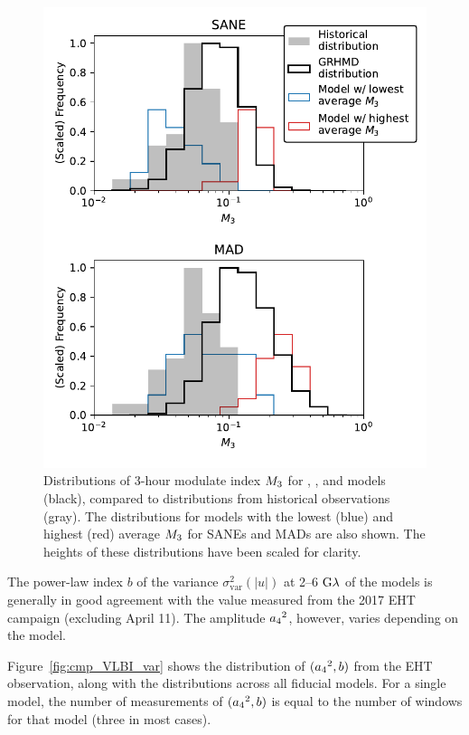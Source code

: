 \begin{figure}
  \centering
  \includegraphics[width=\columnwidth]{./figures/mi_hist.pdf}
  \caption{Distributions of 3-hour modulate index $M_{3}$ for \bhac, \kharma, and \hamr models (black), compared to distributions from historical observations (gray). The distributions for models with the lowest (blue) and highest (red) average $M_{3}$ for SANEs and MADs are also shown. The heights of these distributions have been scaled for clarity.
  }
  \label{fig:cmp_ALMA_var}
\end{figure}


The power-law index $b$ of the variance $\sigma_\text{var}^2 (|u|)$ at 2--6$~{\rm G}\lambda$ of the models is generally in good agreement with the value measured  from the 2017 EHT campaign (excluding April 11). The amplitude ${a_4}^2$, however, varies depending on the model.

Figure~\ref{fig:cmp_VLBI_var} shows the distribution of $({a_4}^2, b)$ from the EHT observation, along with the distributions across all fiducial models. For a single model, the number of measurements of $({a_4}^2, b)$ is equal to the number of windows for that model (three in most cases). 

